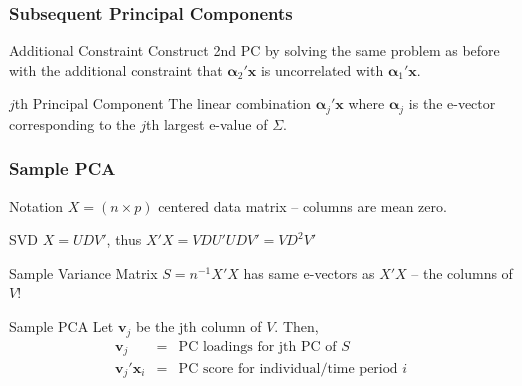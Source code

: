 \begin{frame}
  \frametitle{Subsequent Principal Components}

  \begin{block}{Additional Constraint}
    Construct 2nd PC by solving the same problem as before with the additional constraint that $\boldsymbol{\alpha}_2'\mathbf{x}$ is uncorrelated with $\boldsymbol{\alpha}_1' \mathbf{x}$.
  \end{block}

  \begin{alertblock}{$j$th Principal Component}
    The linear combination $\boldsymbol{\alpha}_j' \mathbf{x}$ where $\boldsymbol{\alpha}_j$ is the e-vector corresponding to the $j$th largest e-value of $\Sigma$.  
  \end{alertblock}
  
\end{frame}
\begin{frame}
  \frametitle{Sample PCA}

  \begin{block}{Notation}
    $X = (n\times p)$ \alert{centered} data matrix -- columns are mean zero.
  \end{block}

  \begin{block}{SVD}
   $X = UDV'$, thus $X'X = VDU'UDV' = VD^2V'$
  \end{block}

  \begin{block}{Sample Variance Matrix}
    $S = n^{-1}X'X$ has same e-vectors as $X'X$ --  the columns of $V$! 
  \end{block}

  \begin{block}{Sample PCA}
    Let $\mathbf{v}_j$ be the jth column of $V$. Then,
    \begin{eqnarray*}
      \mathbf{v}_j &=& \text{PC loadings for jth PC of } S\\
      \mathbf{v}_j' \mathbf{x}_i &=& \text{PC score for individual/time period } i \\
    \end{eqnarray*}
  \end{block}
\end{frame}
